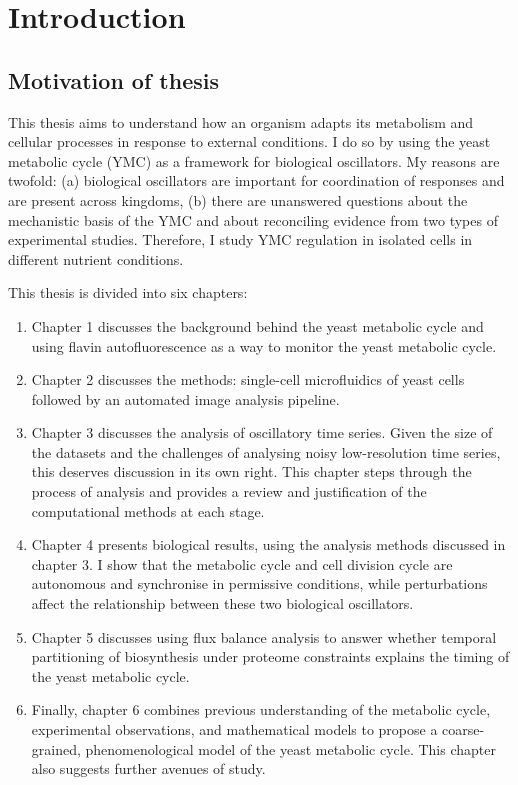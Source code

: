 
\chapter{Introduction}

\section{Motivation of thesis}

This thesis aims to understand how an organism adapts its metabolism and cellular processes in response to external conditions.
I do so by using the yeast metabolic cycle (YMC) as a framework for biological oscillators.
My reasons are twofold: (a) biological oscillators are important for coordination of responses and are present across kingdoms, (b) there are unanswered questions about the mechanistic basis of the YMC and about reconciling evidence from two types of experimental studies.
Therefore, I study YMC regulation in isolated cells in different nutrient conditions.

This thesis is divided into six chapters:
\begin{enumerate}
  \item Chapter 1 discusses the background behind the yeast metabolic cycle and using flavin autofluorescence as a way to monitor the yeast metabolic cycle.
  \item Chapter 2 discusses the methods: single-cell microfluidics of yeast cells followed by an automated image analysis pipeline.
  \item Chapter 3 discusses the analysis of oscillatory time series.
        Given the size of the datasets and the challenges of analysing noisy low-resolution time series, this deserves discussion in its own right.
        This chapter steps through the process of analysis and provides a review and justification of the computational methods at each stage.
  \item Chapter 4 presents biological results, using the analysis methods discussed in chapter 3.
        I show that the metabolic cycle and cell division cycle are autonomous and synchronise in permissive conditions, while perturbations affect the relationship between these two biological oscillators.
  \item Chapter 5 discusses using flux balance analysis to answer whether temporal partitioning of biosynthesis under proteome constraints explains the timing of the yeast metabolic cycle.
  \item Finally, chapter 6 combines previous understanding of the metabolic cycle, experimental observations, and mathematical models to propose a coarse-grained, phenomenological model of the yeast metabolic cycle.
        This chapter also suggests further avenues of study.
\end{enumerate}


